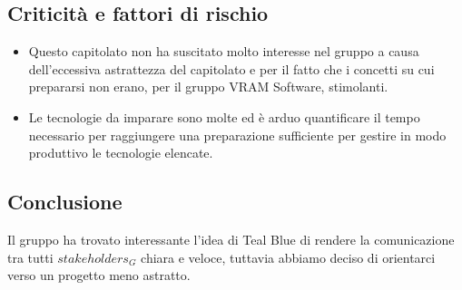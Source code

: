 \subsection{Criticità e fattori di rischio}
\begin{itemize}
	\item Questo capitolato non ha suscitato molto interesse nel gruppo a causa dell'eccessiva astrattezza del capitolato e per il fatto che i concetti su cui prepararsi non erano, per il gruppo VRAM Software, stimolanti. 
	\item Le tecnologie da imparare sono molte ed è arduo quantificare il tempo necessario per raggiungere una preparazione sufficiente per gestire in modo produttivo le tecnologie elencate.
\end{itemize}
\subsection{Conclusione}
Il gruppo ha trovato interessante l'idea di Teal Blue di rendere la comunicazione tra tutti $stakeholders_G$ chiara e veloce, tuttavia abbiamo deciso di orientarci verso un progetto meno astratto.